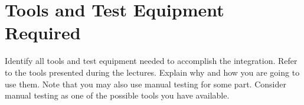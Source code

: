 \section{Tools and Test Equipment Required}

Identify all tools and test equipment needed to accomplish the integration. Refer to the tools presented during the lectures. Explain why and how you are going to use them.
Note that you may also use manual testing for some part. Consider manual testing as one of the possible tools you have available.

